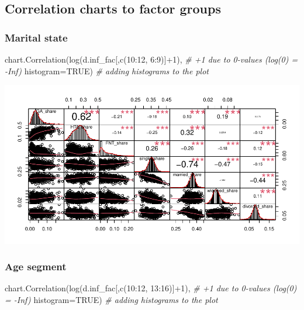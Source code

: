 \documentclass[
]{article}
\newenvironment{Shaded}{\begin{snugshade}}{\end{snugshade}}
\newcommand{\AttributeTok}[1]{\textcolor[rgb]{0.77,0.63,0.00}{#1}}
\newcommand{\CommentTok}[1]{\textcolor[rgb]{0.56,0.35,0.01}{\textit{#1}}}
\newcommand{\ConstantTok}[1]{\textcolor[rgb]{0.00,0.00,0.00}{#1}}
\newcommand{\DecValTok}[1]{\textcolor[rgb]{0.00,0.00,0.81}{#1}}
\newcommand{\FunctionTok}[1]{\textcolor[rgb]{0.00,0.00,0.00}{#1}}
\newcommand{\NormalTok}[1]{#1}
\newcommand{\SpecialCharTok}[1]{\textcolor[rgb]{0.00,0.00,0.00}{#1}}
\begin{document}
\hypertarget{correlation-charts-to-factor-groups}{%
\subsection{Correlation charts to factor
groups}\label{correlation-charts-to-factor-groups}}

\hypertarget{marital-state}{%
\subsubsection{Marital state}\label{marital-state}}

\begin{Shaded}
\begin{Highlighting}[]
\FunctionTok{chart.Correlation}\NormalTok{(}\FunctionTok{log}\NormalTok{(d.inf\_fac[,}\FunctionTok{c}\NormalTok{(}\DecValTok{10}\SpecialCharTok{:}\DecValTok{12}\NormalTok{, }\DecValTok{6}\SpecialCharTok{:}\DecValTok{9}\NormalTok{)]}\SpecialCharTok{+}\DecValTok{1}\NormalTok{), }\CommentTok{\# +1 due to 0{-}values (log(0) = {-}Inf)}
                  \AttributeTok{histogram=}\ConstantTok{TRUE}\NormalTok{) }\CommentTok{\# adding histograms to the plot}
\end{Highlighting}
\end{Shaded}

\includegraphics{Lin_Mod_Clus_Anal_files/figure-latex/unnamed-chunk-5-1.pdf}

\hypertarget{age-segment}{%
\subsubsection{Age segment}\label{age-segment}}

\begin{Shaded}
\begin{Highlighting}[]
\FunctionTok{chart.Correlation}\NormalTok{(}\FunctionTok{log}\NormalTok{(d.inf\_fac[,}\FunctionTok{c}\NormalTok{(}\DecValTok{10}\SpecialCharTok{:}\DecValTok{12}\NormalTok{, }\DecValTok{13}\SpecialCharTok{:}\DecValTok{16}\NormalTok{)]}\SpecialCharTok{+}\DecValTok{1}\NormalTok{), }\CommentTok{\# +1 due to 0{-}values (log(0) = {-}Inf)}
                  \AttributeTok{histogram=}\ConstantTok{TRUE}\NormalTok{) }\CommentTok{\# adding histograms to the plot}
\end{Highlighting}
\end{Shaded}
\end{document}
